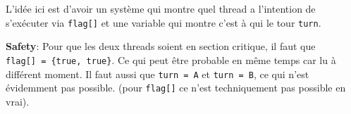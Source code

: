 \begin{Shaded}
\begin{Highlighting}[]
\PreprocessorTok{ }
\PreprocessorTok{ }

\OperatorTok{=}\OperatorTok{;}
\OperatorTok{[];} 
\OperatorTok{[}\OperatorTok{]=}\OperatorTok{;}
\OperatorTok{[}\OperatorTok{]=}\OperatorTok{;}

\OperatorTok{[}\OperatorTok{]=}\OperatorTok{;} 
\OperatorTok{=}\OperatorTok{;} 
\OperatorTok{((}\OperatorTok{[}\OperatorTok{]==}\OperatorTok{)\&\&(}\OperatorTok{==}\OperatorTok{))} \OperatorTok{\{} 
\OperatorTok{\}} 
\OperatorTok{();}
\OperatorTok{[}\OperatorTok{]=}\OperatorTok{;}

\OperatorTok{[}\OperatorTok{]=}\OperatorTok{;} 
\OperatorTok{=}\OperatorTok{;} 
\OperatorTok{((}\OperatorTok{[}\OperatorTok{]==}\OperatorTok{)\&\&(}\OperatorTok{==}\OperatorTok{))} \OperatorTok{\{}
\OperatorTok{\}}
\OperatorTok{();}
\OperatorTok{[}\OperatorTok{]=}\OperatorTok{;}
\end{Highlighting}
\end{Shaded}

L'idée ici est d'avoir un système qui montre quel thread a l'intention
de s'exécuter via \texttt{flag{[}{]}} et une variable qui montre c'est à
qui le tour \texttt{turn}.

\textbf{Safety}: Pour que les deux threads soient en section critique,
il faut que \texttt{flag{[}{]}\ =\ \{true,\ true\}}. Ce qui peut être
probable en même temps car lu à différent moment. Il faut aussi que
\texttt{turn\ =\ A} et \texttt{turn\ =\ B}, ce qui n'est évidemment pas
possible. (pour \texttt{flag{[}{]}} ce n'est techniquement pas possible
en vrai).

